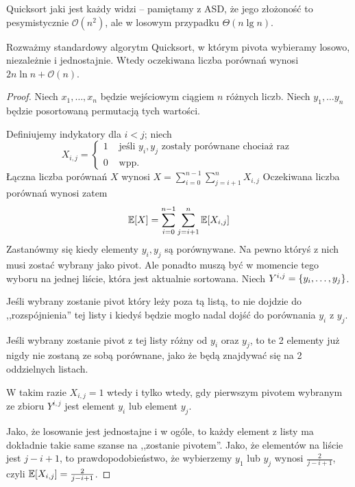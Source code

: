 Quicksort jaki jest każdy widzi -- pamiętamy z ASD, że jego złożoność to pesymistycznie \( \mathcal{O}(n^2) \), ale w losowym przypadku \( \Theta(n \lg n) \).

\begin{theorem}[2.11 P\&C]
    Rozważmy standardowy algorytm Quicksort, w którym pivota wybieramy losowo, niezależnie i jednostajnie.
    Wtedy oczekiwana liczba porównań wynosi \( 2n \ln n + \mathcal{O}(n) \).
\end{theorem}
\begin{proof} Niech \( x_1, \dots, x_n \) będzie wejściowym ciągiem \( n \) różnych liczb.
Niech \( y_1, \dots y_n \) będzie posortowaną permutacją tych wartości.

Definiujemy indykatory dla \( i < j \); niech
\[
    X_{i, j} = \begin{cases}
        1 & \text{ jeśli }  y_i, y_j \text{ zostały porównane chociaż raz } \\
        0 & \text{ wpp. }
    \end{cases}
\]
Łączna liczba porównań \( X \) wynosi
\(
    X = \sum_{i = 0}^{n-1} \sum_{j=i+1}^n X_{i, j}
\)
Oczekiwana liczba porównań wynosi zatem
\[
    \expected{X} = \sum_{i = 0}^{n-1} \sum_{j=i+1}^n \expected{X_{i, j}}
\]
Zastanówmy się kiedy elementy \( y_i, y_j \) są porównywane. Na pewno któryś z nich musi zostać wybrany jako pivot.
Ale ponadto muszą być w momencie tego wyboru na jednej liście, która jest aktualnie sortowana.
Niech \( Y^{i, j} = \set{y_i, \dots, y_j} \).

Jeśli wybrany zostanie pivot który leży poza tą listą, to nie dojdzie do ,,rozspójnienia'' tej listy i kiedyś będzie mogło nadal dojść do porównania \(y_i\) z \(y_j\). 

Jeśli wybrany zostanie pivot z tej listy różny od \(y_i\) oraz \(y_j\), to te 2 elementy już nigdy nie zostaną ze sobą porównane, jako że będą znajdywać się na 2 oddzielnych listach. 

W takim razie \( X_{i, j} = 1 \) wtedy i tylko wtedy, gdy pierwszym pivotem wybranym ze zbioru \( Y^{i, j} \) jest element \( y_i \) lub element \( y_j \).

Jako, że losowanie jest jednostajne i w ogóle, to każdy element z listy ma dokładnie takie same szanse na ,,zostanie pivotem''. Jako, że elementów na liście jest \(j-i+1\), to prawdopodobieństwo, że wybierzemy \(y_1\) lub \(y_j\) wynosi \( \frac{2}{j - i + 1} \), czyli \( \expected{X_{i, j}} = \frac{2}{j - i + 1} \).


\end{proof}
